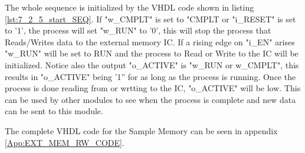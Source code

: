 The whole sequence is initialized by the VHDL code shown in listing \ref{lst:7_2_5_start_SEQ}. If "w\_CMPLT" is set to "CMPLT or "i\_RESET" is set to '1', the process will set "w\_RUN" to '0', this will stop the process that Reads/Writes data to the external memory IC. If a rising edge on "i\_EN" arises "w\_RUN" will be set to RUN and the process to Read or Write to the IC will be initialized. Notice also the output "o\_ACTIVE" is "w\_RUN or w\_CMPLT", this results in "o\_ACTIVE" being '1'' for as long as the process is running. Once the process is done reading from or wrtting to the IC, "o\_ACTIVE" will be low. This can be used by other modules to see when the process is complete and new data can be sent to this module.

 

The complete VHDL code for the Sample Memory can be seen in appendix \ref{App:EXT_MEM_RW_CODE}.